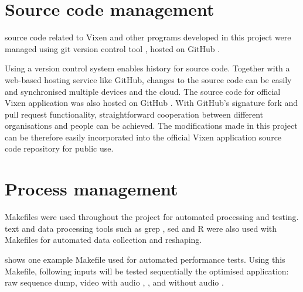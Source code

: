 \renewcommand{\baselinestretch}{\mystretch}
\label{chap:Management}

\section{Source code management}

 source code related to Vixen and other programs developed in this project were managed using  git version control tool \cite{git},  hosted on GitHub \cite{github} \cite{github_vixen_yz} \cite{github_project}.

Using a version control system enables history  for source code. Together with a web-based hosting service like GitHub, changes to the source code can be easily  and synchronised  multiple devices and the cloud. The source code for  official Vixen application was also hosted on GitHub \cite{github_vixen}. With GitHub's signature fork and pull request functionality, straightforward cooperation between different organisations and people can be achieved. The modifications made in this project can be therefore easily incorporated into the official Vixen application source code repository for public use.

\section{Process management}

Makefiles \cite{make} were used throughout the project for automated processing and testing.  text and data processing tools such as grep \cite{grep}, sed \cite{sed} and R \cite{r_project} were also used with Makefiles for automated data collection and reshaping.

 shows one example Makefile used for automated performance tests. Using this Makefile,  following inputs will be tested sequentially  the optimised  application: raw sequence dump,  video with audio , ,  and   without audio .
